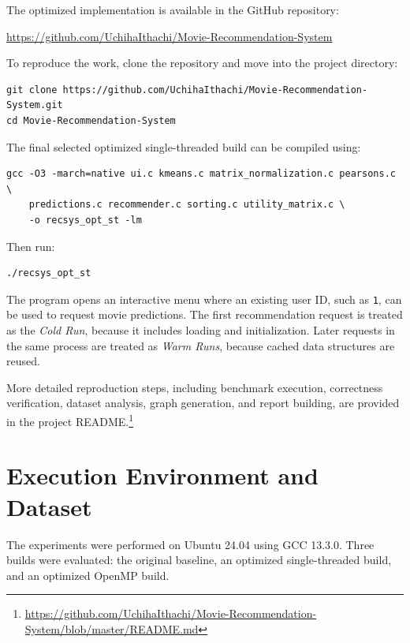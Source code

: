 \documentclass[11pt]{article}
\begin{document}
The optimized implementation is available in the GitHub repository:

\begin{center}
\url{https://github.com/UchihaIthachi/Movie-Recommendation-System}
\end{center}

To reproduce the work, clone the repository and move into the project directory:

\begin{verbatim}
git clone https://github.com/UchihaIthachi/Movie-Recommendation-System.git
cd Movie-Recommendation-System
\end{verbatim}

The final selected optimized single-threaded build can be compiled using:

\begin{verbatim}
gcc -O3 -march=native ui.c kmeans.c matrix_normalization.c pearsons.c \
    predictions.c recommender.c sorting.c utility_matrix.c \
    -o recsys_opt_st -lm
\end{verbatim}

Then run:

\begin{verbatim}
./recsys_opt_st
\end{verbatim}

The program opens an interactive menu where an existing user ID, such as
\texttt{1}, can be used to request movie predictions. The first recommendation
request is treated as the \textit{Cold Run}, because it includes loading and
initialization. Later requests in the same process are treated as
\textit{Warm Runs}, because cached data structures are reused.

More detailed reproduction steps, including benchmark execution, correctness
verification, dataset analysis, graph generation, and report building, are
provided in the project README.\footnote{
\url{https://github.com/UchihaIthachi/Movie-Recommendation-System/blob/master/README.md}
}

\section{Execution Environment and Dataset}

The experiments were performed on Ubuntu 24.04 using GCC 13.3.0. Three builds were evaluated: the original baseline, an optimized single-threaded build, and an optimized OpenMP build.
\end{document}
